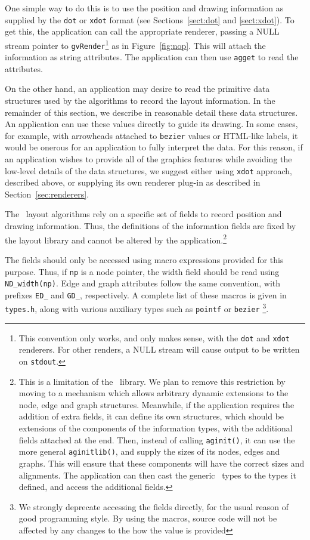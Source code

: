 One simple way to do this is to use the position and drawing information as
supplied by the {\tt dot} or {\tt xdot} format (see
Sections~\ref{sect:dot} and \ref{sect:xdot}). To get this, the application
can call the appropriate renderer, passing a NULL stream
pointer to {\tt gvRender}\footnote{
This convention only works, and only makes sense, with the {\tt dot} 
and {\tt xdot} renderers. For other renders, a NULL stream will cause
output to be written on {\tt stdout}.} as in Figure~\ref{fig:nop}.
This will attach the information as string attributes. The application
can then use {\tt agget} to read the attributes.

On the other hand, an application may desire to read the primitive
data structures used by the algorithms to record the layout information.
In the remainder of this section, 
we describe in reasonable detail these data structures.
An application can
use these values directly to guide its drawing. In some cases, for example,
with arrowheads attached to {\tt bezier} values or HTML-like labels, it
would be onerous for an application to fully interpret the data.
For this reason,
if an application wishes to provide all of the
graphics features while avoiding the low-level details of the data
structures, we suggest either using {\tt xdot} approach, described above,
or supplying its own renderer plug-in as described in
Section~\ref{sec:renderers}.

The \gviz\ layout algorithms rely on a specific set of fields
to record position and drawing information.
Thus, the definitions
of the information fields are fixed by the layout library and
cannot be altered by the application.\footnote{This is a limitation
of the \graph\ library. We plan to remove this restriction by moving to
a mechanism which allows arbitrary dynamic extensions to the
node, edge and graph structures. Meanwhile, if the application requires
the addition of extra fields, it can define its own structures, which
should be extensions of the components of the information types, with
the additional fields attached at the end. Then, instead of calling
{\tt aginit()}, it can use the more general {\tt aginitlib()}, and
supply the sizes of its nodes, edges and graphs. This will ensure
that these components will have the correct sizes and alignments. 
The application can then cast the generic \graph\ types to the
types it defined, and access the additional fields.}

The fields should only be accessed using macro expressions provided for
this purpose.
Thus, if {\tt np} is a node pointer, the width field should
be read using \verb+ND_width(np)+.
Edge and graph attributes follow the same convention, with
prefixes \verb+ED_+ and \verb+GD_+, respectively.
A complete list of these macros is given in {\tt types.h}, 
along with various auxiliary types such as {\tt pointf} or 
{\tt bezier}
\footnote{We strongly deprecate accessing the fields directly, for the usual reason
of good programming style. By using the macros, source code will not be 
affected by any changes to the how the value is provided}.

